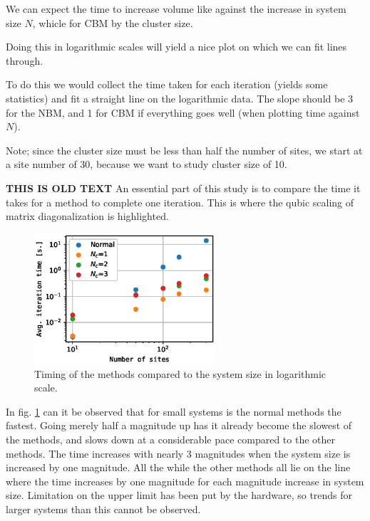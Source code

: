\documentclass[11pt]{article}
\begin{document}
We can expect the time to increase volume like against the increase in system size $N$, whicle for CBM by the cluster size. 

Doing this in logarithmic scales will yield a nice plot on which we can fit lines through. 

To do this we would collect the time taken for each iteration (yields some statistics) and fit a straight line on the logarithmic data. The slope should be 3 for the NBM, and 1 for CBM if everything goes well (when plotting time against $N$). 

Note; since the cluster size must be less than half the number of sites, we start at a site number of 30, because we want to study cluster size of 10. 


\textbf{THIS IS OLD TEXT} An essential part of this study is to compare the time it takes for a method to complete one iteration. This is where the qubic scaling of matrix diagonalization is highlighted. 

\begin{figure}[ht]
	\centering
	\includegraphics[width=0.6\textwidth]{figures/timing_plot}
	\caption{Timing of the methods compared to the system size in logarithmic scale. }
	\label{fig:timing_comp}
\end{figure}

In fig. \ref{fig:timing_comp} can it be observed that for small systems is the normal methods the fastest. Going merely half a magnitude up has it already become the slowest of the methods, and slows down at a considerable pace compared to the other methods. The time increases with nearly 3 magnitudes when the system size is increased by one magnitude. All the while the other methods all lie on the line where the time increases by one magnitude for each magnitude increase in system size. Limitation on the upper limit has been put by the hardware, so trends for larger systems than this cannot be observed. 
\end{document}
